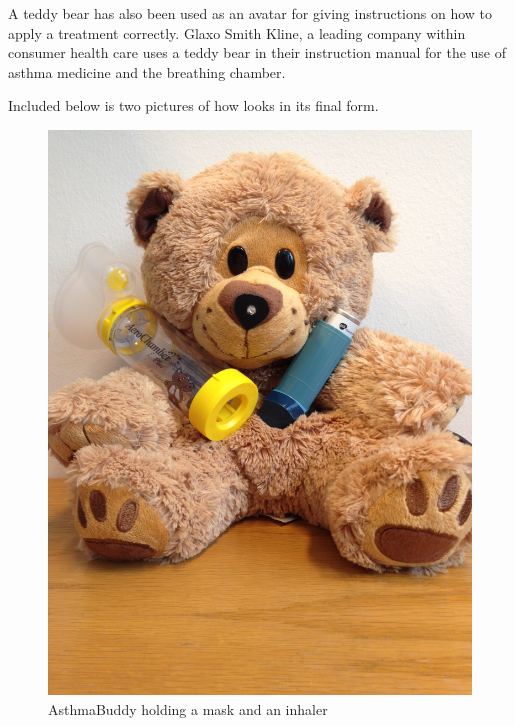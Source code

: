 A teddy bear has also been used as an avatar for giving instructions on how to apply a treatment correctly. Glaxo Smith Kline, a leading company within consumer health care uses a teddy bear in their instruction manual for the use of asthma medicine and the breathing chamber\cite{glaxosmithkline}. 

Included below is two pictures of how \ab{} looks in its final form. 

\begin{figure}[H] 
	\begin{minipage}[t]{0.4\linewidth}
	\centering
		\includegraphics[width=0.3\paperwidth]{Pictures/abandinhaler.jpg}
	\caption[AsthmaBuddy holding a mask and an inhaler]{AsthmaBuddy holding a mask and an inhaler}
	\label{fig:asthmabuddyandinhaler}
	\end{minipage}
	\hspace{2.0cm}
	\begin{minipage}[t]{0.4\linewidth}
		\centering

\end{minipage}
\end{figure}
